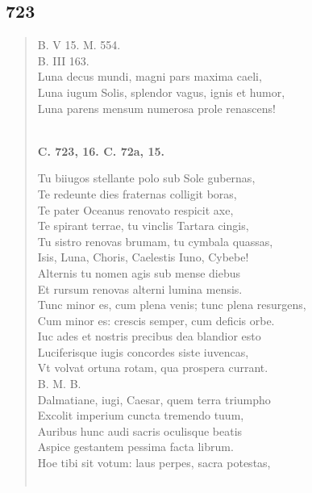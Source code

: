 \documentclass[11pt, a4paper]{report}
\begin{document}
            \subsection*{723}
      \begin{verse}
      B. V 15. M. 554. \\ B. III 163. \\ Luna decus mundi, magni pars maxima caeli, \\ Luna iugum Solis, splendor vagus, ignis et humor, \\ Luna parens mensum numerosa prole renascens! \\ 
        ﻿\pagebreak 
     \marginpar{[208]} \begin{center} \textbf{C. 723, 16. C. 72a, 15.} \end{center}Tu biiugos stellante polo sub Sole gubernas, \\ Te redeunte dies fraternas colligit boras, \\ Te pater Oceanus renovato respicit axe, \\ Te spirant terrae, tu vinclis Tartara cingis, \\ Tu sistro renovas brumam, tu cymbala quassas, \\ Isis, Luna, Choris, Caelestis Iuno, Cybebe! \\ Alternis tu nomen agis sub mense diebus \\ Et rursum renovas alterni lumina mensis. \\ Tunc minor es, cum plena venis; tunc plena resurgens, \\ Cum minor es: crescis semper, cum deficis orbe. \\ Iuc ades et nostris precibus dea blandior esto \\ Luciferisque iugis concordes siste iuvencas, \\ Vt volvat ortuna rotam, qua prospera currant. \\ B. M. B. \\ Dalmatiane, iugi, Caesar, quem terra triumpho \\ Excolit imperium cuncta tremendo tuum, \\ Auribus hunc audi sacris oculisque beatis \\ Aspice gestantem pessima facta librum. \\ Hoe tibi sit votum: laus perpes, sacra potestas, \\ 
        ﻿\pagebreak 

\end{verse}
\end{document}

